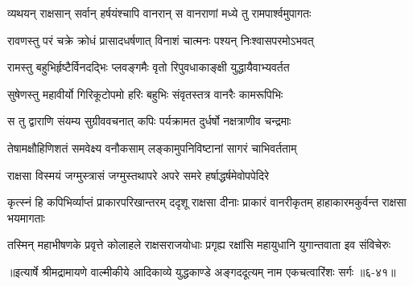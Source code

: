 \twolineshloka
{व्यथयन् राक्षसान् सर्वान् हर्षयंश्चापि वानरान्}
{स वानराणां मध्ये तु रामपार्श्वमुपागतः} %

\twolineshloka
{रावणस्तु परं चक्रे क्रोधं प्रासादधर्षणात्}
{विनाशं चात्मनः पश्यन् निःश्वासपरमोऽभवत्} %

\twolineshloka
{रामस्तु बहुभिर्हृष्टैर्विनदद्भिः प्लवङ्गमैः}
{वृतो रिपुवधाकाङ्क्षी युद्धायैवाभ्यवर्तत} %

\twolineshloka
{सुषेणस्तु महावीर्यो गिरिकूटोपमो हरिः}
{बहुभिः संवृतस्तत्र वानरैः कामरूपिभिः} %

\twolineshloka
{स तु द्वाराणि संयम्य सुग्रीववचनात् कपिः}
{पर्यक्रामत दुर्धर्षो नक्षत्राणीव चन्द्रमाः} %

\twolineshloka
{तेषामक्षौहिणिशतं समवेक्ष्य वनौकसाम्}
{लङ्कामुपनिविष्टानां सागरं चाभिवर्तताम्} %

\twolineshloka
{राक्षसा विस्मयं जग्मुस्त्रासं जग्मुस्तथापरे}
{अपरे समरे हर्षाद्धर्षमेवोपपेदिरे} %

\threelineshloka
{कृत्स्नं हि कपिभिर्व्याप्तं प्राकारपरिखान्तरम्}
{ददृशू राक्षसा दीनाः प्राकारं वानरीकृतम्}
{हाहाकारमकुर्वन्त राक्षसा भयमागताः} %

\twolineshloka
{तस्मिन् महाभीषणके प्रवृत्ते कोलाहले राक्षसराजयोधाः}
{प्रगृह्य रक्षांसि महायुधानि युगान्तवाता इव संविचेरुः} %


॥इत्यार्षे श्रीमद्रामायणे वाल्मीकीये आदिकाव्ये युद्धकाण्डे अङ्गददूत्यम् नाम एकचत्वारिंशः सर्गः ॥६-४१॥
